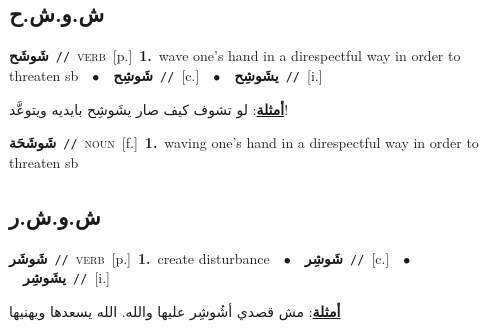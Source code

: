 \documentclass[10pt,a4paper,twoside]{article} %
\begin{document}
\begin{multicols}{2}
\vspace{-3mm}
\subsection*{\color{blue}\foreignlanguage{arabic}{ش.و.ش.ح}\color{blue}{}} 

{\setlength\topsep{0pt}\textbf{\foreignlanguage{arabic}{شَوشَح}}\ {\color{gray}\texttt{//}\color{black}}\ \textsc{verb}\ [p.]\ \textbf{1.}~wave one's hand in a direspectful way in order to threaten sb\ \ $\bullet$\ \ \setlength\topsep{0pt}\textbf{\foreignlanguage{arabic}{شَوشِح}}\ {\color{gray}\texttt{//}\color{black}}\ [c.]\ \ $\bullet$\ \ \setlength\topsep{0pt}\textbf{\foreignlanguage{arabic}{يشَوشِح}}\ {\color{gray}\texttt{//}\color{black}}\ [i.]\  \begin{flushright}\color{gray}\foreignlanguage{arabic}{\textbf{\underline{\foreignlanguage{arabic}{أمثلة}}}: لو تشوف كيف صار يشَوشِح بايديه ويتوعَّد!}\end{flushright}\color{black}} \vspace{2mm}

{\setlength\topsep{0pt}\textbf{\foreignlanguage{arabic}{شَوشَحَة}}\ {\color{gray}\texttt{//}\color{black}}\ \textsc{noun}\ [f.]\ \textbf{1.}~waving one's hand in a direspectful way in order to threaten sb\ } \vspace{2mm}

\vspace{-3mm}
\subsection*{\color{blue}\foreignlanguage{arabic}{ش.و.ش.ر}\color{blue}{}} 

{\setlength\topsep{0pt}\textbf{\foreignlanguage{arabic}{شَوشَر}}\ {\color{gray}\texttt{//}\color{black}}\ \textsc{verb}\ [p.]\ \textbf{1.}~create disturbance\ \ $\bullet$\ \ \setlength\topsep{0pt}\textbf{\foreignlanguage{arabic}{شَوشِر}}\ {\color{gray}\texttt{//}\color{black}}\ [c.]\ \ $\bullet$\ \ \setlength\topsep{0pt}\textbf{\foreignlanguage{arabic}{يشَوشِر}}\ {\color{gray}\texttt{//}\color{black}}\ [i.]\  \begin{flushright}\color{gray}\foreignlanguage{arabic}{\textbf{\underline{\foreignlanguage{arabic}{أمثلة}}}: مش قصدي أشُوشِر عليها والله. الله يسعدها ويهنيها}\end{flushright}\color{black}} \vspace{2mm}


\end{multicols}
\end{document}
